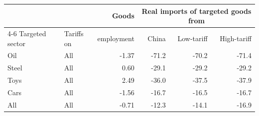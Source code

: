 \begin{tabular}{llrrrr}
\toprule
 & & Goods & \multicolumn{3}{c}{Real imports of targeted goods from} \\
\cmidrule(lr){4-6}
Targeted sector & Tariffs on & employment & China & Low-tariff & High-tariff \\
\midrule
Oil & All & -1.37 & -71.2 & -70.2 & -71.4 \\
\midrule
Steel & All & 0.60 & -29.1 & -29.2 & -29.2 \\
\midrule
Toys & All & 2.49 & -36.0 & -37.5 & -37.9 \\
\midrule
Cars & All & -1.56 & -16.7 & -16.5 & -16.7 \\
\midrule
All & All & -0.71 & -12.3 & -14.1 & -16.9 \\
\bottomrule
\end{tabular}
